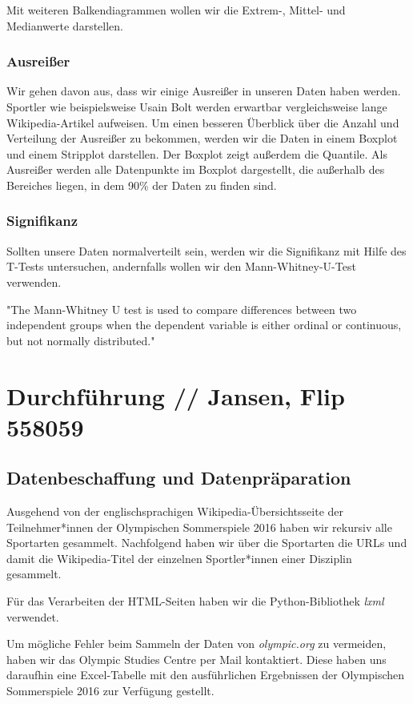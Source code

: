 \documentclass[11pt]{article}
\begin{document}
Mit weiteren Balkendiagrammen wollen wir die Extrem-, Mittel- und Medianwerte darstellen.

\subsubsection{Ausreißer}
Wir gehen davon aus, dass wir einige Ausreißer in unseren Daten haben werden. Sportler wie beispielsweise Usain Bolt werden erwartbar vergleichsweise lange Wikipedia-Artikel aufweisen. Um einen besseren Überblick über die Anzahl und Verteilung der Ausreißer zu bekommen, werden wir die Daten in einem Boxplot und einem Stripplot darstellen. Der Boxplot zeigt außerdem die Quantile. Als Ausreißer werden alle Datenpunkte im Boxplot dargestellt, die außerhalb des Bereiches liegen, in dem 90\% der Daten zu finden sind.

\subsubsection{Signifikanz}
Sollten unsere Daten normalverteilt sein, werden wir die Signifikanz mit Hilfe des T-Tests untersuchen, andernfalls wollen wir den Mann-Whitney-U-Test verwenden. 

"The Mann-Whitney U test is used to compare differences between two independent groups when the dependent variable is either ordinal or continuous, but not normally distributed." \parencite{LundResearchLtd}


\section {Durchführung // Jansen, Flip 558059}

\subsection {Datenbeschaffung und Datenpräparation}
Ausgehend von der englischsprachigen Wikipedia-Übersichtsseite der Teilnehmer*innen der Olympischen Sommerspiele 2016 \parencite{wikiOlympicComp} haben wir rekursiv alle Sportarten gesammelt. Nachfolgend haben wir über die Sportarten die URLs und damit die Wikipedia-Titel der einzelnen Sportler*innen einer Disziplin gesammelt. 

Für das Verarbeiten der HTML-Seiten haben wir die Python-Bibliothek \textit{lxml} \parencite{lxml} verwendet.

Um mögliche Fehler beim Sammeln der Daten von \textit{olympic.org} zu vermeiden, haben wir das Olympic Studies Centre per Mail kontaktiert. Diese haben uns daraufhin eine Excel-Tabelle mit den ausführlichen Ergebnissen der Olympischen Sommerspiele 2016 zur Verfügung gestellt.
\end{document}
